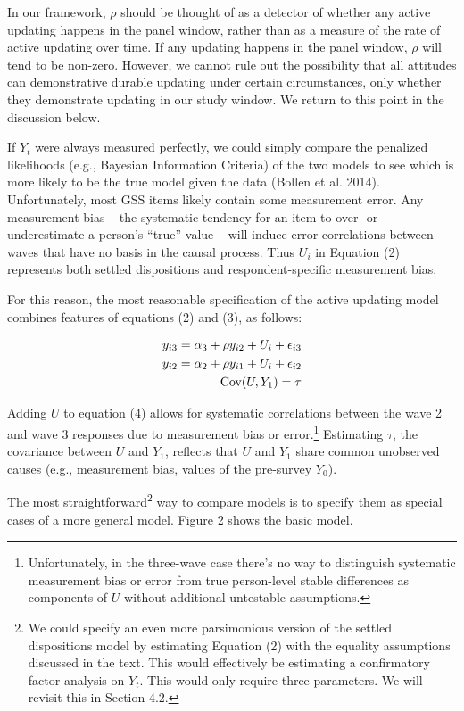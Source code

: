\documentclass[
  11pt,
]{article}
\begin{document}
In our framework, \(\rho\) should be thought of as a detector of whether any active updating happens in the panel window, rather than as a measure of the rate of active updating over time. If any updating happens in the panel window, \(\rho\) will tend to be non-zero. However, we cannot rule out the possibility that all attitudes can demonstrative durable updating under certain circumstances, only whether they demonstrate updating in our study window. We return to this point in the discussion below.

If \(Y_t\) were always measured perfectly, we could simply compare the penalized likelihoods (e.g., Bayesian Information Criteria) of the two models to see which is more likely to be the true model given the data (Bollen et al. 2014). Unfortunately, most GSS items likely contain some measurement error. Any measurement bias -- the systematic tendency for an item to over- or underestimate a person's ``true'' value -- will induce error correlations between waves that have no basis in the causal process. Thus \(U_i\) in Equation (2) represents both settled dispositions and respondent-specific measurement bias.

For this reason, the most reasonable specification of the active updating model combines features of equations (2) and (3), as follows:

\begin{eqnarray}
  y_{i3} = \alpha_3 + \rho y_{i2} + U_i + \epsilon_{i3} \\ 
  y_{i2} = \alpha_2 + \rho y_{i1} + U_i + \epsilon_{i2} \notag \\
  \text{Cov}(U,Y_1) = \tau \notag
\end{eqnarray}

Adding \(U\) to equation (4) allows for systematic correlations between the wave 2 and wave 3 responses due to measurement bias or error.\footnote{Unfortunately, in the three-wave case there's no way to distinguish systematic measurement bias or error from true person-level stable differences as components of \(U\) without additional untestable assumptions.} Estimating \(\tau\), the covariance between \(U\) and \(Y_1\), reflects that \(U\) and \(Y_1\) share common unobserved causes (e.g., measurement bias, values of the pre-survey \(Y_0\)).

The most straightforward\footnote{We could specify an even more parsimonious version of the settled dispositions model by estimating Equation (2) with the equality assumptions discussed in the text. This would effectively be estimating a confirmatory factor analysis on \(Y_t\). This would only require three parameters. We will revisit this in Section 4.2.} way to compare models is to specify them as special cases of a more general model. Figure 2 shows the basic model.
\end{document}
